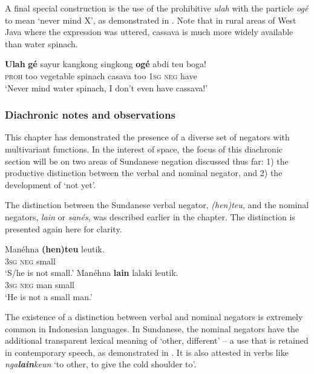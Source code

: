 \documentclass[output=paper]{langscibook}
\begin{document}
A final special construction is the use of the prohibitive \textit{ulah} with the particle \textit{ogé} to mean ‘never mind X’, as demonstrated in . Note that in rural areas of West Java where the expression was uttered, cassava is much more widely available than water spinach. 

\ea\label{ex:sun:64} 
    \gll  \textbf{Ulah} \textbf{gé} sayur kangkong singkong \textbf{ogé} abdi teu boga!\\ 
          \textsc{proh} too vegetable spinach casava too 1\textsc{sg} \textsc{neg} have\\
    \glt ‘Never mind water spinach, I don’t even have cassava!’ \citep[159]{Butters2021}
\z 

\subsubsection{Diachronic notes and observations}\label{sec:sun:4.6.3}

 This chapter has demonstrated the presence of a diverse set of negators with multivariant functions. In the interest of space, the focus of this diachronic section will be on two areas of Sundanese negation discussed thus far: 1) the productive distinction between the verbal and nominal negator, and 2) the development of ‘{not yet}’. 

The distinction between the Sundanese verbal negator, \textit{(hen)teu,} and the nominal negators, \textit{lain} or \textit{sanés}, was described earlier in the chapter. The distinction is presented again here for clarity.  

\ea\label{ex:sun:65}
    \ea\label{ex:sun:65a}
        \gll  Manéhna \textbf{(hen)teu} leutik.\\ 
              3\textsc{sg} \textsc{neg} small\\
        \glt ‘S/he is not small.’
    \ex\label{ex:sun:65b}
        \gll  Manéhna \textbf{lain} lalaki leutik.\\
              3\textsc{sg} \textsc{neg} man small \\
        \glt ‘He is not a small man.’
    \z
\z 

The existence of a distinction between verbal and nominal negators is extremely common in Indonesian languages. In Sundanese, the nominal negators have the additional transparent lexical meaning of ‘other, different’ – a use that is retained in contemporary speech, as demonstrated in . It is also attested in verbs like \textit{nga}\textbf{\textit{lain}}\textit{keun} ‘to other, to give the cold shoulder to’. 
\end{document}
